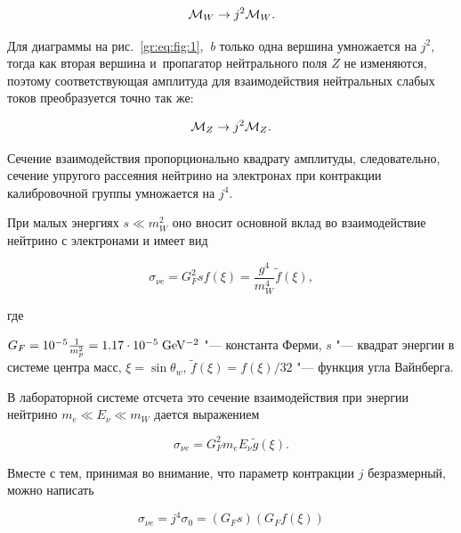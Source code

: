 $${\cal M}_W \rightarrow j^2{\cal M}_W.$$

Для диаграммы на рис.~\ref{gr:eq:fig:1},~{\it b} только одна вершина умножается на $j^{2}$, тогда как вторая вершина и~пропагатор нейтрального поля $Z$ не изменяются, поэтому соответствующая амплитуда для взаимодействия нейтральных слабых токов преобразуется  точно так же: 

$${\cal M}_Z \rightarrow j^2{\cal M}_Z.$$ 

Сечение взаимодействия пропорционально квадрату амплитуды, следовательно, сечение упругого рассеяния нейтрино на электронах при контракции калибровочной группы умножается на $j^{4}$.

При малых энергиях $s \ll m_W^2$ оно вносит основной вклад во взаимодействие нейтрино с электронами и имеет вид

 \cite{gromov:O-05}

\begin{equation}

\sigma_{\nu e} = G_F^2s f(\xi)=\frac{g^4}{m_W^4} \tilde{f}(\xi),

\label{gr:eq:cs-e}

\end{equation}

где

$G_F=10^{-5}\frac{1}{m_p^2}=1.17\cdot 10^{-5}\;\rm GeV^{-2}$ "--- константа Ферми, $s$ "--- квадрат энергии в системе центра масс, $\xi=\sin \theta_w$, $\tilde{f}(\xi)=f(\xi)/32$ "--- функция угла Вайнберга. 

% 

В лабораторной системе отсчета это сечение взаимодействия при энергии нейтрино $m_e \ll E_{\nu} \ll m_W$ дается выражением \cite[Eq.~(10.19)]{gromov:PDG-2010} 

\begin{equation}

\sigma_{\nu e} = G_F^2 m_e E_{\nu} \tilde{g}(\xi).

\label{gr:eq:cs-e-11}

\end{equation}

%

Вместе с тем,  принимая во внимание, что параметр контракции $j$ безразмерный, можно написать

\begin{equation}

\sigma_{\nu e} =j^4\sigma_0=(G_Fs)(G_F f(\xi))

\label{gr:eq:cs-e-1}

\end{equation}

